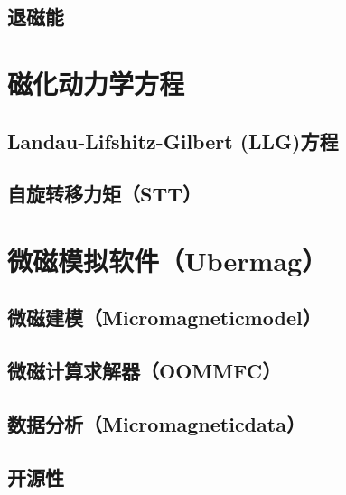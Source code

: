 \subsection{退磁能}
\section{磁化动力学方程}
\subsection{Landau-Lifshitz-Gilbert (LLG)方程}
\subsection{自旋转移力矩（STT）}
\section{微磁模拟软件（Ubermag）}
\subsection{微磁建模（Micromagneticmodel）}
\subsection{微磁计算求解器（OOMMFC）}	
\subsection{数据分析（Micromagneticdata）}
\subsection{开源性}
\newpage